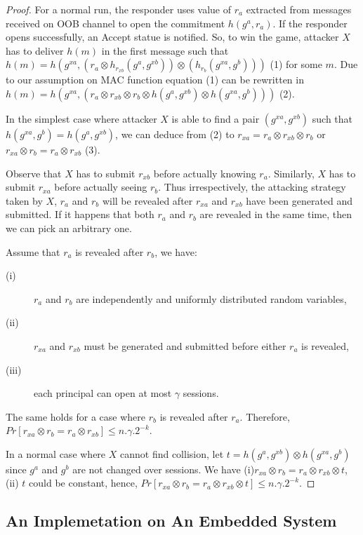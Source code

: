 \begin{proof}
For a normal run, the responder uses value of $r_a$ extracted from messages received on OOB channel to open the commitment $h(g^a, r_a)$. If the responder opens successfully, an Accept statue is notified. So, to win the game, attacker $X$ has to deliver $h(m)$ in the first message such that $h(m) = h(g^{xa}, (r_a \otimes h_{r_{xb}}(g^a,g^{xb})) \otimes (h_{r_b}(g^{xa},g^b)))$ (1) for some $m$. Due to our assumption on MAC function equation (1) can be rewritten in $h(m) = h(g^{xa}, (r_a \otimes r_{xb} \otimes r_b \otimes h(g^a,g^{xb}) \otimes h(g^{xa},g^b)))$ (2). 

In the simplest case where attacker $X$ is able to find a pair $(g^{xa},g^{xb})$ such that $h(g^{xa},g^b) = h(g^a,g^{xb})$, we can deduce from (2) to $r_{xa} = r_a \otimes r_{xb} \otimes r_b$ or $r_{xa} \otimes r_b = r_a \otimes r_{xb}$ (3).

Observe that $X$ has to submit $r_{xb}$ before actually knowing $r_a$. Similarly, $X$ has to submit $r_{xa}$ before actually seeing $r_b$. Thus irrespectively, the attacking strategy taken by $X$, $r_a$ and $r_b$ will be revealed after $r_{xa}$ and $r_{xb}$ have been generated and submitted. If it happens that both $r_a$ and $r_b$ are revealed in the same time, then we can pick an arbitrary one. 

Assume that $r_a$ is revealed after $r_b$, we have:
\begin{description}
 \item [(i)] $r_a$ and $r_b$ are independently and uniformly distributed random variables, 
 \item [(ii)] $r_{xa}$ and $r_{xb}$ must be generated and submitted before either $r_a$ is revealed, 
 \item [(iii)] each principal can open at most $\gamma$ sessions. 
\end{description}
The same holds for a case where $r_b$ is revealed after $r_a$. Therefore, $Pr[r_{xa} \otimes r_b = r_a \otimes r_{xb}] \leq n.\gamma.2^{-k}$.

In a normal case where $X$ cannot find collision, let $t= h(g^a,g^{xb}) \otimes h(g^{xa},g^b)$ since $g^a$ and $g^b$ are not changed over sessions. We have (i)$r_{xa} \otimes r_b = r_a \otimes r_{xb} \otimes t $, (ii) $t$ could be constant, hence, $Pr[r_{xa} \otimes r_b = r_a \otimes r_{xb} \otimes t ] \leq n.\gamma.2^{-k}$. 
\end{proof}

\subsection{An Implemetation on An Embedded System} 

